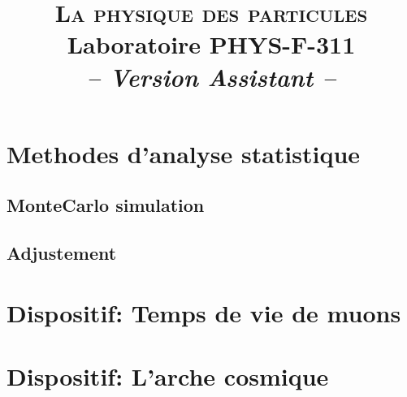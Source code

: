 \documentclass[full]{labInstructions}
\title{{\Huge \scshape La physique des particules}\\{\Large Laboratoire PHYS-F-311}\\{\large\textit{-- Version Assistant --}}}
\date{}
\begin{document}
\maketitle
\tableofcontents
\newpage




\section{Methodes d'analyse statistique}
\subsection{MonteCarlo simulation}
\subsection{Adjustement}






\section{Dispositif: Temps de vie de muons}

\section{Dispositif: L'arche cosmique}
\end{document}
